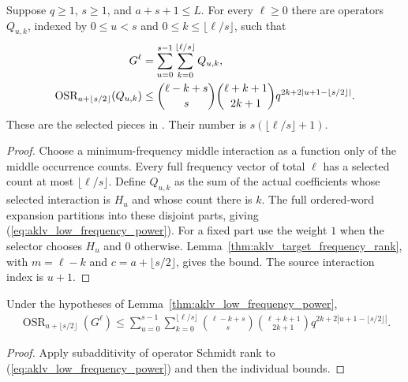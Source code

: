 \begin{lemma}
    \label{thm:aklv_low_frequency_power}
    \leanok
    Suppose $q\ge1$, $s\ge1$, and $a+s+1\le L$. For every $\ell\ge0$ there
    are operators $Q_{u,k}$, indexed by $0\le u<s$ and
    $0\le k\le\lfloor\ell/s\rfloor$, such that
    \begin{align}
        G^\ell & =\sum_{u=0}^{s-1}\sum_{k=0}^{\lfloor\ell/s\rfloor}Q_{u,k},
        \label{eq:aklv_low_frequency_power}                                 \\
        \operatorname{OSR}_{a+\lfloor s/2\rfloor}(Q_{u,k})
               & \le\binom{\ell-k+s}{s}\binom{\ell+k+1}{2k+1}
        q^{2k+2|u+1-\lfloor s/2\rfloor|}.\notag
    \end{align}
    These are the selected pieces in \cite[Lemma~4.2]{Arad2013AreaLaw}.
    Their number is $s(\lfloor\ell/s\rfloor+1)$.
\end{lemma}
\begin{proof}
    \leanok
    Choose a minimum-frequency middle interaction as a function only of the
    middle occurrence counts. Every full frequency vector of total $\ell$
    has a selected count at most $\lfloor\ell/s\rfloor$.
    Define $Q_{u,k}$ as the sum of the actual coefficients whose selected
    interaction is $H_u$ and whose count there is $k$. The full ordered-word
    expansion partitions into these disjoint parts, giving
    (\ref{eq:aklv_low_frequency_power}).
    For a fixed part use the weight $1$ when the selector chooses $H_u$ and
    $0$ otherwise. Lemma~\ref{thm:aklv_target_frequency_rank}, with
    $m=\ell-k$ and $c=a+\lfloor s/2\rfloor$, gives the bound.
    The source interaction index is $u+1$.
\end{proof}

\begin{lemma}
    \label{thm:aklv_power_rank_sum}
    \leanok
    Under the hypotheses of Lemma~\ref{thm:aklv_low_frequency_power},
    \begin{align*}
        \operatorname{OSR}_{a+\lfloor s/2\rfloor}(G^\ell)
        \le\sum_{u=0}^{s-1}\sum_{k=0}^{\lfloor\ell/s\rfloor}
        \binom{\ell-k+s}{s}\binom{\ell+k+1}{2k+1}
        q^{2k+2|u+1-\lfloor s/2\rfloor|}.
    \end{align*}
\end{lemma}
\begin{proof}
    \leanok
    Apply subadditivity of operator Schmidt rank to
    (\ref{eq:aklv_low_frequency_power}) and then the individual bounds.
\end{proof}

